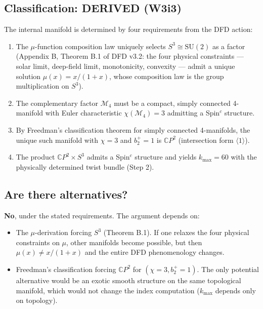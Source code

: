 \documentclass[11pt,a4paper]{article}
\newcommand{\CP}{\mathbb{C}P}
\begin{document}
\subsection{Classification: DERIVED (W3i3)}

The internal manifold is determined by four requirements from the DFD
action:

\begin{enumerate}[label=(\alph*)]
\item The $\mu$-function composition law uniquely selects $S^3 \cong
  \mathrm{SU}(2)$ as a factor (Appendix B, Theorem B.1 of DFD v3.2:
  the four physical constraints --- solar limit, deep-field limit,
  monotonicity, convexity --- admit a unique solution
  $\mu(x) = x/(1+x)$, whose composition law is the group
  multiplication on $S^3$).

\item The complementary factor $\mathcal{M}_4$ must be a compact,
  simply connected 4-manifold with Euler characteristic
  $\chi(\mathcal{M}_4) = 3$ admitting a Spin$^c$ structure.

\item By Freedman's classification theorem for simply connected
  4-manifolds, the unique such manifold with $\chi = 3$ and $b_2^+ = 1$
  is $\CP^2$ (intersection form $\langle 1 \rangle$).

\item The product $\CP^2 \times S^3$ admits a Spin$^c$ structure and
  yields $k_{\max} = 60$ with the physically determined twist bundle
  (Step 2).
\end{enumerate}

\subsection{Are there alternatives?}

\textbf{No}, under the stated requirements. The argument depends on:
\begin{itemize}[nosep]
\item The $\mu$-derivation forcing $S^3$ (Theorem B.1). If one
  relaxes the four physical constraints on $\mu$, other manifolds
  become possible, but then $\mu(x) \neq x/(1+x)$ and the entire
  DFD phenomenology changes.
\item Freedman's classification forcing $\CP^2$ for
  $(\chi = 3, b_2^+ = 1)$. The only potential alternative would be an
  exotic smooth structure on the same topological manifold, which would
  not change the index computation ($k_{\max}$ depends only on
  topology).
\end{itemize}
\end{document}
